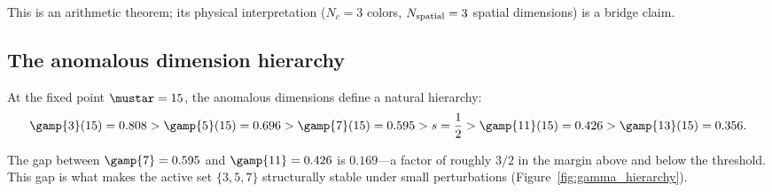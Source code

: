 \documentclass[12pt,a4paper]{article}
\begin{document}
This is an arithmetic theorem; its physical interpretation ($N_c = 3$
colors, $N_{\rm spatial} = 3$ spatial dimensions) is a bridge claim.

\subsection{The anomalous dimension hierarchy}
\label{sec:ch8_hierarchy}

At the fixed point $\mustar = 15$, the anomalous dimensions define
a natural hierarchy:
\begin{equation}
  \gamp{3}(15) = 0.808 > \gamp{5}(15) = 0.696 > \gamp{7}(15) = 0.595
  > s = \frac{1}{2} > \gamp{11}(15) = 0.426 > \gamp{13}(15) = 0.356.
  \label{eq:gamma_hierarchy}
\end{equation}

The gap between $\gamp{7} = 0.595$ and $\gamp{11} = 0.426$ is
$0.169$---a factor of roughly $3/2$ in the margin above and below
the threshold. This gap is what makes the active set $\{3,5,7\}$
structurally stable under small perturbations
(Figure~\ref{fig:gamma_hierarchy}).
\end{document}
